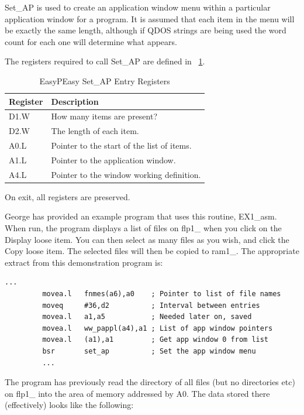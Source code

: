 Set\_AP is used to create an application window menu within a particular
            application window for a program. It is assumed that each item in the menu
            will be exactly the same length, although if QDOS strings are being used the
            word count for each one will determine what appears.

The registers required to call Set\_AP are defined in \tablename~\ref{tab:EasyPEasySetAPEntryRegisters}.

\begin{table}[htbp]
\centering
\begin{tabular}{l p{}}
\toprule
\textbf{Register} & \textbf{Description}  \\
\midrule
%
D1.W & How many items are present?\\
D2.W & The length of each item.\\
A0.L & Pointer to the start of the list of items.\\
A1.L & Pointer to the application window.\\
A4.L & Pointer to the window working definition.\\
%
\bottomrule
\end{tabular}
\caption{EasyPEasy Set\_AP Entry Registers}
\label{tab:EasyPEasySetAPEntryRegisters}
\end{table}

On exit, all registers are preserved.

George has provided an example program that uses this routine,
 EX1\_asm. When run, the program displays a list of files
            on flp1\_ when you click on the Display loose item. You can then select as many
            files as you wish, and click the Copy loose item. The selected files will then
            be copied to ram1\_. The appropriate extract from this demonstration program
            is:

\begin{lstlisting}[firstnumber=1,caption={EasyPEasy - SetAP Example},label={lst:EasyPeasySetAPExample}]
         ...
         movea.l   fnmes(a6),a0    ; Pointer to list of file names
         moveq     #36,d2          ; Interval between entries
         movea.l   a1,a5           ; Needed later on, saved
         movea.l   ww_pappl(a4),a1 ; List of app window pointers
         movea.l   (a1),a1         ; Get app window 0 from list
         bsr       set_ap          ; Set the app window menu
         ...
\end{lstlisting}

The program has previously read the directory of all files (but no
            directories etc) on flp1\_ into the area of memory addressed by A0. The data
            stored there (effectively) looks like the following:

